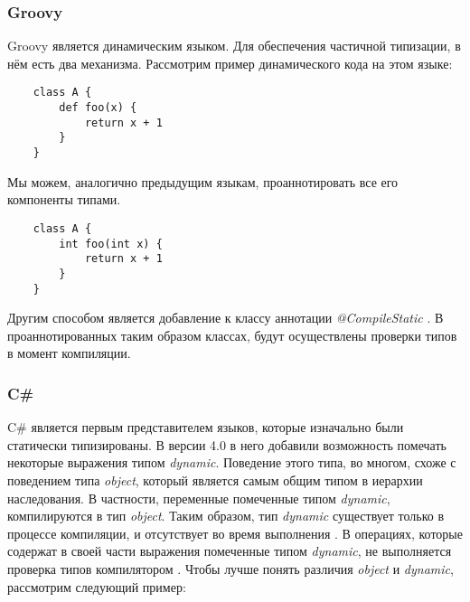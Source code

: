 \subsubsection{Groovy}

Groovy является динамическим языком. Для обеспечения частичной типизации, в нём есть два механизма. Рассмотрим пример динамического кода на этом языке:

\begin{verbatim}
    class A {
        def foo(x) {
            return x + 1
        }
    }
\end{verbatim}

Мы можем, аналогично предыдущим языкам, проаннотировать все его компоненты типами.

\begin{verbatim}
    class A {
        int foo(int x) {
            return x + 1
        }
    }
\end{verbatim}

Другим способом является добавление к классу аннотации \textit{@CompileStatic} \cite{groovy:compileStatic}. В проаннотированных таким образом классах, будут осуществлены проверки типов в момент компиляции.



\subsubsection{C{\#}}

    C{\#} является первым представителем языков, которые изначально были статически типизированы. В версии 4.0 в него добавили возможность помечать некоторые выражения типом \textit{dynamic}. Поведение этого типа, во многом, схоже с поведением типа \textit{object}, который является самым общим типом в иерархии наследования. В частности, переменные помеченные типом \textit{dynamic}, компилируются в тип \textit{object}. Таким образом, тип \textit{dynamic} существует только в процессе компиляции, и отсутствует во время выполнения \cite{msdn:dynamicType}. В операциях, которые содержат в своей части выражения помеченные типом \textit{dynamic}, не выполняется проверка типов компилятором \cite{book:troelsen2012proCSharp}. Чтобы лучше понять различия \textit{object} и \textit{dynamic}, рассмотрим следующий пример:

